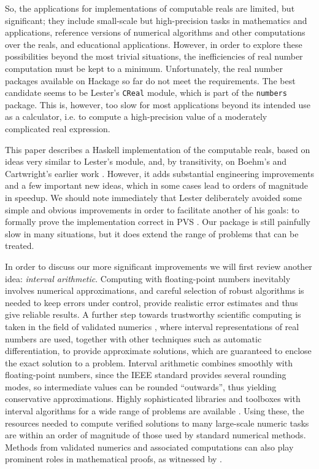 \documentclass[9pt, a4, twocolumn]{article}
\begin{document}
So, the applications for implementations of computable reals are
limited, but significant; they include small-scale but high-precision tasks in
mathematics and applications, reference versions of numerical algorithms
and other computations over the reals, and educational applications. 
However, in order to explore these possibilities beyond the most
trivial situations, the inefficiencies of real number computation must
be kept to a minimum. Unfortunately, the real number packages
available on Hackage so far do not meet the requirements. 
The best candidate seems to be Lester's \texttt{CReal} module, which
is part of the \texttt{numbers} package. This is, however, too slow
for most applications beyond its intended use as a calculator, i.e. to compute
a high-precision value of a moderately
complicated real expression.

This paper describes a Haskell implementation of the computable reals,
based on ideas very similar to Lester's module, and, by transitivity, on
Boehm's and Cartwright's earlier work \cite{boehm}. However, it
adds substantial engineering improvements and a few important new
ideas, which in some cases lead to orders of magnitude
in speedup. We should note immediately that Lester deliberately
avoided some simple and obvious improvements in order to facilitate
another of his goals: to formally prove the implementation correct in
PVS \cite{LesterGowland, Lester2011}. Our package is still
painfully slow in many situations, but it does extend the range of
problems that can be treated.

In order to discuss our more significant improvements we will
first review another idea: \emph{interval arithmetic}.
Computing with floating-point numbers inevitably involves numerical
approximations, and careful selection of robust algorithms is needed to 
keep errors under control, provide realistic error estimates and
thus give reliable results. A further step towards trustworthy
scientific computing is taken in the field of validated numerics \cite{Tucker}, where
interval representations of real numbers are used, together with other
techniques such as automatic differentiation, to provide
approximate solutions, which are guaranteed to enclose the exact
solution to a problem. Interval arithmetic combines
smoothly with floating-point numbers, since the IEEE standard
provides several rounding modes, so intermediate values can be
rounded ``outwards'', thus yielding conservative approximations.
Highly sophisticated libraries and toolboxes with interval
algorithms for a wide range of problems are available \cite{boost, Rump}.  Using these, the
resources needed to compute verified solutions to many large-scale numeric tasks 
are within an order of magnitude of those used by standard numerical methods.
Methods from validated numerics and associated computations can also play 
prominent roles in mathematical proofs, as witnessed by \cite{tucker2002}.
\end{document}
